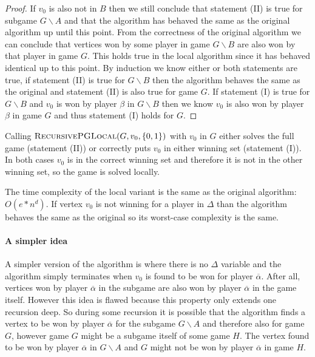 \begin{theorem}
\begin{proof}
	If $v_0$ is also not in $B$ then we still conclude that statement (II) is true for subgame $G\backslash A$ and that the algorithm has behaved the same as the original algorithm up until this point. From the correctness of the original algorithm we can conclude that vertices won by some player in game $G\backslash B$ are also won by that player in game $G$. This holds true in the local algorithm since it has behaved identical up to this point. By induction we know either or both statements are true, if statement (II) is true for $G\backslash B$ then the algorithm behaves the same as the original and statement (II) is also true for game $G$. If statement (I) is true for $G \backslash B$ and $v_0$ is won by player $\beta$ in $G\backslash B$ then we know $v_0$ is also won by player $\beta$ in game $G$ and thus statement (I) holds for $G$.
\end{proof}
\end{theorem}
Calling $\textsc{RecursivePGLocal}(G, v_0, \{0,1\})$ with $v_0$ in $G$ either solves the full game (statement (II)) or correctly puts $v_0$ in either winning set (statement (I)). In both cases $v_0$ is in the correct winning set and therefore it is not in the other winning set, so the game is solved locally.

The time complexity of the local variant is the same as the original algorithm: $O(e*n^d)$. If vertex $v_0$ is not winning for a player in $\Delta$ than the algorithm behaves the same as the original so its worst-case complexity is the same.

\paragraph{A simpler idea} A simpler version of the algorithm is where there is no $\Delta$ variable and the algorithm simply terminates when $v_0$ is found to be won for player $\overline{\alpha}$. After all, vertices won by player $\overline{\alpha}$ in the subgame are also won by player $\overline{\alpha}$ in the game itself. However this idea is flawed because this property only extends one recursion deep. So during some recursion it is possible that the algorithm finds a vertex to be won by player $\overline{\alpha}$ for the subgame $G\backslash A$ and therefore also for game $G$, however game $G$ might be a subgame itself of some game $H$. The vertex found to be won by player $\overline{\alpha}$ in $G\backslash A$ and $G$ might not be won by player $\overline{\alpha}$ in game $H$.

